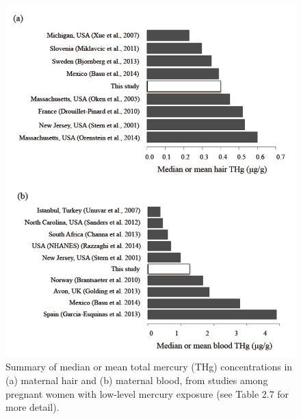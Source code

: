 \begin{figure}
  \centering
    \label{fig:Fig217}
  \includegraphics[scale=1]{Figures/Fig217.pdf}
  \caption[Summary of median or mean total mercury concentrations in (a) maternal hair and (b) maternal blood, from studies among pregnant women with low-level mercury exposure]{Summary of median or mean total mercury (THg) concentrations in (a) maternal hair and (b) maternal blood, from studies among pregnant women with low-level mercury exposure (see Table 2.7 for more detail).}
\end{figure}





















